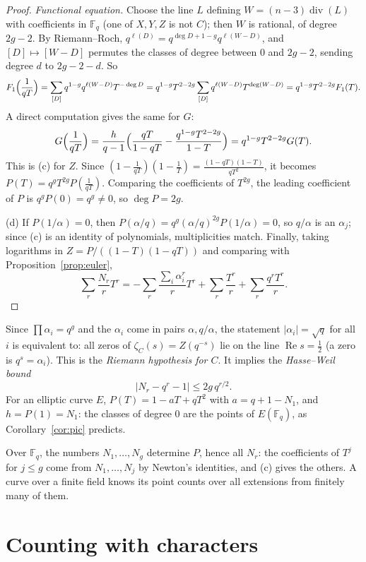 \begin{proof}
\emph{Functional equation.} Choose the line $L$ defining $W=(n-3)\operatorname{div}(L)$ with coefficients in $\mathbb F_q$ (one of $X,Y,Z$ is not $C$); then $W$ is
rational, of degree $2g-2$. By Riemann--Roch, $q^{\ell(D)}=q^{\deg D+1-g}q^{\ell(W-D)}$, and $[D]\mapsto[W-D]$ permutes the classes of degree between $0$ and
$2g-2$, sending degree $d$ to $2g-2-d$. So
\[
F_1\Bigl(\frac1{qT}\Bigr)=\sum_{[D]}q^{1-g}q^{\ell(W-D)}T^{-\deg D}=q^{1-g}T^{2-2g}\sum_{[D]}q^{\ell(W-D)}T^{\deg(W-D)}=q^{1-g}T^{2-2g}F_1(T).
\]
A direct computation gives the same for $G$:
\[
G\Bigl(\frac1{qT}\Bigr)=\frac h{q-1}\Bigl(\frac{qT}{1-qT}-\frac{q^{1-g}T^{2-2g}}{1-T}\Bigr)=q^{1-g}T^{2-2g}G(T).
\]
This is (c) for $Z$. Since $(1-\frac1{qT})(1-\frac1T)=\frac{(1-qT)(1-T)}{qT^2}$, it becomes $P(T)=q^gT^{2g}P(\frac1{qT})$. Comparing the coefficients of $T^{2g}$,
the leading coefficient of $P$ is $q^gP(0)=q^g\ne0$, so $\deg P=2g$.

(d) If $P(1/\alpha)=0$, then $P(\alpha/q)=q^g(\alpha/q)^{2g}P(1/\alpha)=0$, so $q/\alpha$ is an $\alpha_j$; since (c) is an identity of polynomials, multiplicities
match. Finally, taking logarithms in $Z=P/((1-T)(1-qT))$ and comparing with Proposition~\ref{prop:euler},
\[
\sum_r\frac{N_r}rT^r=-\sum_r\frac{\sum_i\alpha_i^r}rT^r+\sum_r\frac{T^r}r+\sum_r\frac{q^rT^r}r.
\]
\end{proof}

\begin{remark}
Since $\prod\alpha_i=q^g$ and the $\alpha_i$ come in pairs $\alpha,q/\alpha$, the statement $|\alpha_i|=\sqrt q$ for all $i$ is equivalent to: all zeros of
$\zeta_C(s)=Z(q^{-s})$ lie on the line $\operatorname{Re}s=\frac12$ (a zero is $q^{s}=\alpha_i$). This is the \emph{Riemann hypothesis for $C$}. It implies the
\emph{Hasse--Weil bound}
\[
|N_r-q^r-1|\le2g\,q^{r/2}.
\]
For an elliptic curve $E$, $P(T)=1-aT+qT^2$ with $a=q+1-N_1$, and $h=P(1)=N_1$: the classes of degree $0$ are the points of $E(\mathbb F_q)$, as
Corollary~\ref{cor:pic} predicts.
\end{remark}

Over $\mathbb F_q$, the numbers $N_1,\dots,N_g$ determine $P$, hence all $N_r$: the coefficients of $T^j$ for $j\le g$ come from $N_1,\dots,N_j$ by Newton's
identities, and (c) gives the others. A curve over a finite field knows its point counts over all extensions from finitely many of them.

\section{Counting with characters}

